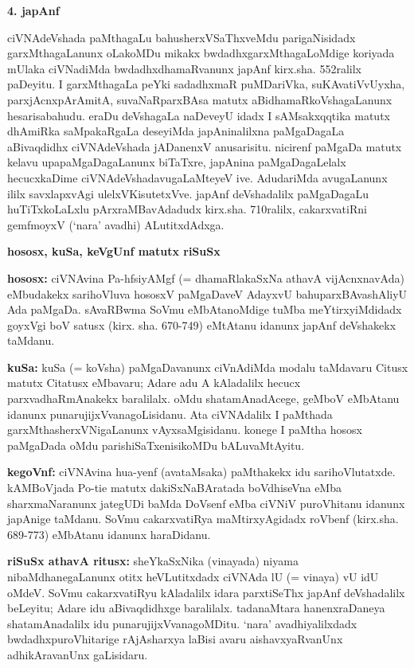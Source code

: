 \begin{center}
{\textbf{\Large 4. japAnf}}
\end{center}

ciVNAdeVshada paMthagaLu bahusherxVSaThxveMdu parigaNisidadx garxMthagaLanunx oLakoMDu mikakx bwdadhxgarxMthagaLoMdige koriyada mUlaka ciVNadiMda bwdadhxdhamaRvanunx japAnf kirx.sha. 552ralilx paDeyitu. I garxMthagaLa peYki sadadhxmaR puMDariVka, suKAvatiVvUyxha, parxjAcnxpArAmitA, suvaNaRparxBAsa matutx aBidhamaRkoVshagaLanunx hesarisabahudu. eraDu deVshagaLa naDeveyU idadx I sAMsakxqqtika matutx dhAmiRka saMpakaRgaLa deseyiMda japAninalilxna paMgaDagaLa aBivaqdidhx ciVNAdeVshada jADanenxV anusarisitu. nicirenf paMgaDa matutx kelavu upapaMgaDagaLanunx biTaTxre, japAnina paMgaDagaLelalx hecucxkaDime ciVNAdeVshadavugaLaMteyeV ive. AdudariMda avugaLanunx ililx savxlapxvAgi ulelxVKisutetxVve. japAnf deVshadalilx paMgaDagaLu huTiTxkoLaLxlu pArxraMBavAdadudx kirx.sha. 710ralilx, cakarxvatiRni gemfmoyxV (`nara' avadhi) ALutitxdAdxga.

\begin{center}
{\textbf{\Large hososx, kuSa, keVgUnf matutx riSuSx}}
\end{center}

{\bf hososx:} ciVNAvina Pa-hfsiyAMgf (= dhamaRlakaSxNa athavA vijAcnxnavAda) eMbudakekx sarihoVluva hososxV paMgaDaveV AdayxvU bahuparxBAvashAliyU Ada paMgaDa. sAvaRBwma SoVmu eMbAtanoMdige tuMba meYtirxyiMdidadx goyxVgi boV satusx (kirx. sha. 670-749) eMtAtanu idanunx japAnf deVshakekx taMdanu.

{\bf kuSa:} kuSa (= koVsha) paMgaDavanunx ciVnAdiMda modalu taMdavaru Citusx matutx Citatusx eMbavaru; Adare adu A kAladalilx hecucx parxvadhaRmAnakekx baralilalx. oMdu shatamAnadAcege, geMboV eMbAtanu idanunx punarujijxVvanagoLisidanu. Ata ciVNAdalilx I paMthada garxMthasherxVNigaLanunx vAyxsaMgisidanu. konege I paMtha hososx paMgaDada oMdu parishiSaTxenisikoMDu bALuvaMtAyitu.

{\bf kegoVnf:} ciVNAvina hua-yenf (avataMsaka) paMthakekx idu sarihoVlutatxde. kAMBoVjada Po-ti{e} matutx dakiSxNaBAratada boVdhiseVna eMba sharxmaNaranunx jategUDi baMda DoVsenf eMba ciVNiV puroVhitanu idanunx japAnige taMdanu. SoVmu cakarxvatiRya maMtirxyAgidadx roVbenf (kirx.sha. 689-773) eMbAtanu idanunx haraDidanu.

{\bf riSuSx athavA ritusx:} sheYkaSxNika (vinayada) niyama nibaMdhanegaLanunx otitx heVLutitxdadx ciVNAda lU (= vinaya) vU idU oMdeV. SoVmu cakarxvatiRyu kAladalilx idara parxtiSeThx japAnf deVshadalilx beLeyitu; Adare idu aBivaqdidhxge baralilalx. tadanaMtara hanenxraDaneya shatamAnadalilx idu punarujijxVvanagoMDitu. `nara' avadhiyalilxdadx bwdadhxpuroVhitarige rAjAsharxya laBisi avaru aishavxyaRvanUnx adhikAravanUnx gaLisidaru.

